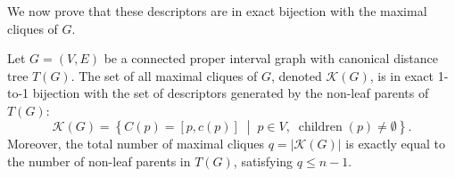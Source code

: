 We now prove that these descriptors are in exact bijection with the maximal cliques of $G$.

\begin{lemma}
\label{lem:maximal-clique-interval-representation}
Let $G = (V, E)$ be a connected proper interval graph with canonical distance tree $T(G)$. The set of all maximal cliques of $G$, denoted $\mathcal{K}(G)$, is in exact 1-to-1 bijection with the set of descriptors generated by the non-leaf parents of $T(G)$:
\begin{equation}
    \mathcal{K}(G) = \left\{ C(p) = [p, c(p)] \;\middle|\; p \in V, \; \operatorname{children}(p) \ne \emptyset \right\}.
\end{equation}
Moreover, the total number of maximal cliques $q = |\mathcal{K}(G)|$ is exactly equal to the number of non-leaf parents in $T(G)$, satisfying $q \le n - 1$.
\end{lemma}
